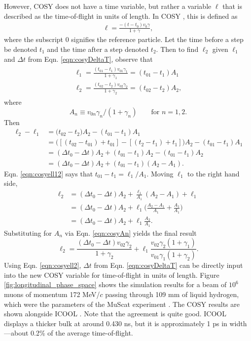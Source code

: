 However, COSY does not have a time variable, but rather a variable $\ell$ that is described as the time-of-flight in units of length. In COSY \cite{cosy}, this is defined as
\begin{align*}
\ell=\frac{-(t-t_0)v_0\gamma}{1+\gamma},
\end{align*}
where the subscript $0$ signifies the reference particle. Let the time before a step be denoted $t_1$ and the time after a step denoted $t_2$. Then to find $\ell_2$ given $\ell_1$ and $\Delta t$ from Eqn. \ref{eqn:cosyDeltaT}, observe that
\begin{align} \label{eqn:cosyell12}
\begin{split}
\ell_1=\frac{(t_{01}-t_1)v_{01}\gamma_1}{1+\gamma_1} = (t_{01}-t_1)A_1\\
\ell_2=\frac{(t_{02}-t_2)v_{02}\gamma_2}{1+\gamma_2} = (t_{02}-t_2)A_2,
\end{split}
\end{align}
where 
\begin{equation}\label{eqn:cosyAn}
A_n \equiv v_{0n}\gamma_n / (1+\gamma_n) \qquad \text{for }n=1,2.
\end{equation}
Then
\begin{align*}
\ell_2 - \ell_1 &=\big(t_{02}-t_2\big)A_2-(t_{01}-t_1)A_1\\
&=\big([(t_{02}-t_{01})+t_{01}]-[(t_2-t_1)+t_1]\big)A_2-(t_{01}-t_1)A_1\\
&=(\Delta t_0 - \Delta t )A_2 + (t_{01}-t_1)A_2-(t_{01}-t_1)A_2\\
&=(\Delta t_0 - \Delta t )A_2 + (t_{01}-t_1)(A_2-A_1).
\end{align*}
Eqn. \ref{eqn:cosyell12} says that $t_{01}-t_1=\ell_1/A_1$. Moving $\ell_1$ to the right hand side,
\begin{align*}
\ell_2 &= (\Delta t_0 - \Delta t)A_2 + \frac{\ell_1}{A_1}(A_2-A_1)+\ell_1\\
&=(\Delta t_0 - \Delta t)A_2 + \ell_1\Big(\frac{A_2-A_1}{A_1}+\frac{A_1}{A_1}\Big)\\
&=(\Delta t_0 - \Delta t)A_2 + \ell_1\frac{A_2}{A_1}.
\end{align*}
Substituting for $A_n$ via Eqn. \ref{eqn:cosyAn} yields the final result
\begin{equation}\label{eqn:cosyell2}
\ell_2=\frac{(\Delta t_0 - \Delta t) v_{02}\gamma_2}{1+\gamma_2}+\ell_1 \frac{v_{02}\gamma_2 (1+\gamma_1)}{v_{01}\gamma_1 (1+\gamma_2)}.
\end{equation}
Using Eqn. \ref{eqn:cosyell2}, $\Delta t$ from Eqn. \ref{eqn:cosyDeltaT} can be directly input into the new COSY variable for time-of-flight in units of length. Figure \ref{fig:longitudinal_phase_space} shows the simulation results for a beam of $10^6$ muons of momentum 172 MeV/$c$ passing through 109 mm of liquid hydrogen, which were the parameters of the MuScat experiment \cite{muscat}. The COSY results are shown alongside ICOOL \cite{icool}. Note that the agreement is quite good. ICOOL displays a thicker bulk at around 0.430 ns, but it is approximately 1 ps in width---about 0.2\% of the average time-of-flight.

